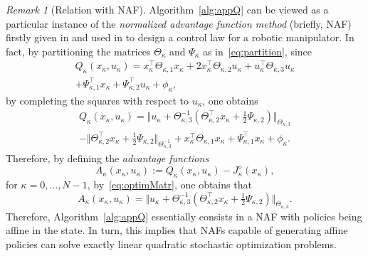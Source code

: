 \documentclass[10pt]{IEEEtran}      %
\theoremstyle{theorem}
\theoremstyle{remark}
\newtheorem{remm}{Remark}
\begin{document}
\begin{remm}[Relation with NAF]
Algorithm~\ref{alg:appQ} can be viewed as a particular instance of the \emph{normalized advantage function
method} (briefly, NAF) firstly given in \cite{gu2016continuous} and used in \cite{sangiovanni2018deep} to design
a control law for a robotic manipulator. In fact, by partitioning the matrices $\Theta_\kappa$ and $\Psi_{\kappa}$ as
in~\eqref{eq:partition}, since
\begin{multline*}
Q_\kappa(x_\kappa,u_\kappa)=x_\kappa^\top \Theta_{\kappa,1} x_\kappa+ 2 x_\kappa^\top \Theta_{\kappa,2} u_\kappa
+u_\kappa^\top \Theta_{\kappa,3} u_\kappa \\
+ \Psi_{\kappa,1}^\top x_\kappa + \Psi_{\kappa,2}^\top u_\kappa + \phi_\kappa,
\end{multline*}
by completing the squares \cite{meyer2000matrix} with respect to $u_\kappa$, one obtains
\begin{multline*}
Q_\kappa(x_\kappa,u_\kappa)=\Vert u_\kappa + \Theta_{\kappa,3}^{-1}(\Theta_{\kappa,2}^\top x_\kappa + \tfrac{1}{2}\Psi_{\kappa,2})\Vert_{\Theta_{\kappa,3}}\\
-\Vert \Theta_{\kappa,2}^\top x_\kappa + \tfrac{1}{2}\Psi_{\kappa,2}\Vert_{\Theta_{\kappa,3}^{-1}}+
x_\kappa^\top \Theta_{\kappa,1} x_\kappa + \Psi_{\kappa,1}^\top x_\kappa + \phi_\kappa.
\end{multline*}
Therefore, by defining the \emph{advantage functions}
\begin{equation*}
A_\kappa(x_\kappa,u_\kappa):=Q_\kappa(x_\kappa,u_\kappa)-J_\kappa^\diamond(x_\kappa),
\end{equation*}
for $\kappa=0,\dots,N-1$, by~\eqref{eq:optimMatr}, one obtains that
\begin{equation*}
A_\kappa(x_\kappa,u_\kappa)=\Vert u_\kappa + \Theta_{\kappa,3}^{-1}(\Theta_{\kappa,2}^\top x_\kappa + \tfrac{1}{2}\Psi_{\kappa,2})\Vert_{\Theta_{\kappa,3}}.
\end{equation*}
Therefore, Algorithm~\ref{alg:appQ} essentially consists in a NAF with policies being affine in the state.
In turn, this implies that NAFs capable of generating affine policies can solve exactly linear quadratic stochastic optimization problems.
\end{remm}
\end{document}
